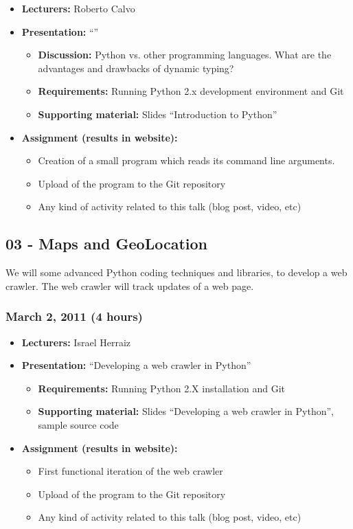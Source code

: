 \documentclass[a4paper]{article}
\begin{document}
\begin{itemize}
\item \textbf{Lecturers:} Roberto Calvo
\item \textbf{Presentation:} ``''
  \begin{itemize}
  \item \textbf{Discussion:} Python vs. other programming
    languages. What are the advantages and drawbacks of dynamic
    typing?
  \item \textbf{Requirements:} Running Python 2.x development
    environment and Git
  \item \textbf{Supporting material:} Slides ``Introduction to Python''
  \end{itemize}
\item \textbf{Assignment (results in website):} 
  \begin{itemize}
  \item Creation of a small program which reads its command line
    arguments.
  \item Upload of the program to the Git repository
  \item Any kind of activity
    related to this talk (blog post, video, etc)
  \end{itemize}
\end{itemize}


\subsection{03 - Maps and GeoLocation}

We will some advanced Python coding techniques and libraries, to
develop a web crawler. The web crawler  will track updates of a web
page.

\subsubsection{March 2, 2011 (4 hours)}

\begin{itemize}
\item \textbf{Lecturers:} Israel Herraiz
\item \textbf{Presentation:} ``Developing a web crawler in Python''
  \begin{itemize}
  \item \textbf{Requirements:} Running Python 2.X installation and Git
  \item \textbf{Supporting material:} Slides ``Developing a web
    crawler in Python'', sample source code
  \end{itemize}
\item \textbf{Assignment (results in website):} 
  \begin{itemize}
  \item First functional iteration of the web crawler
  \item Upload of the program to the Git repository
  \item Any kind of activity
    related to this talk (blog post, video, etc)
  \end{itemize}
\end{itemize}
\end{document}
